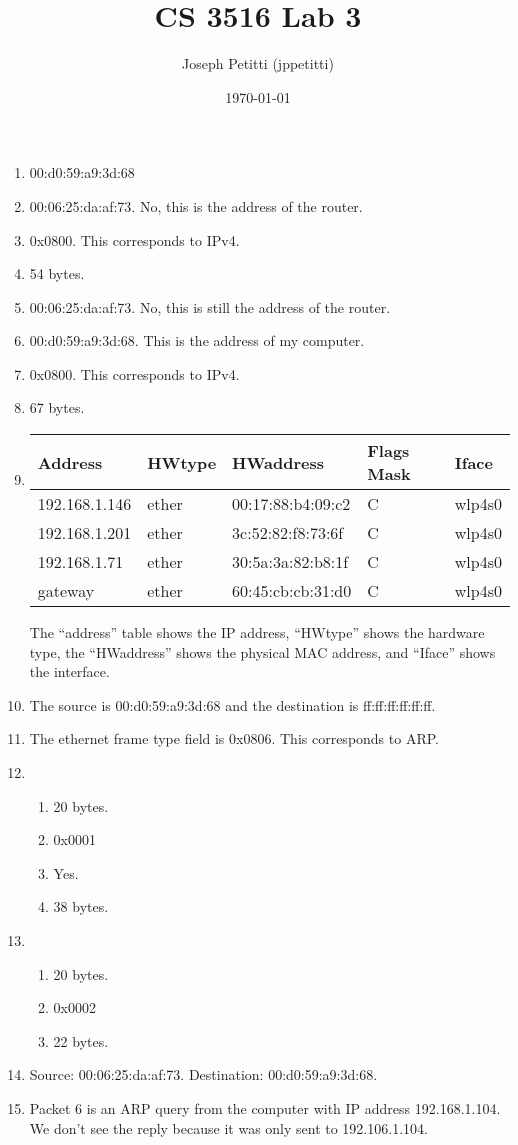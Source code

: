 \documentclass[12pt, letterpaper]{article}
\title{CS 3516 Lab 3}
\author{Joseph Petitti (jppetitti)}
\date{\today}
\begin{document}
\maketitle

\begin{enumerate}
	\item 00:d0:59:a9:3d:68
	\item 00:06:25:da:af:73. No, this is the address of the router.
	\item 0x0800. This corresponds to IPv4.
	\item 54 bytes.
	\item 00:06:25:da:af:73. No, this is still the address of the router.
	\item 00:d0:59:a9:3d:68. This is the address of my computer.
	\item 0x0800. This corresponds to IPv4.
	\item 67 bytes.
	\item
		\begin{tabular}{l | l | l | l | l}
			Address & HWtype & HWaddress & Flags Mask & Iface \\
			\hline
			192.168.1.146 & ether & 00:17:88:b4:09:c2 & C & wlp4s0 \\
			192.168.1.201 & ether & 3c:52:82:f8:73:6f & C & wlp4s0 \\
			192.168.1.71  & ether & 30:5a:3a:82:b8:1f & C & wlp4s0 \\
			gateway       & ether & 60:45:cb:cb:31:d0 & C & wlp4s0 \\
		\end{tabular}
		
				The ``address'' table shows the IP address, ``HWtype'' shows the
				hardware type, the ``HWaddress'' shows the physical MAC address,
				and ``Iface'' shows the interface.
	\item The source is 00:d0:59:a9:3d:68 and the destination is
			ff:ff:ff:ff:ff:ff.
	\item The ethernet frame type field is 0x0806. This corresponds to ARP.
	\item 
			\begin{enumerate}
					\item 20 bytes.
					\item 0x0001
					\item Yes.
					\item 38 bytes.
			\end{enumerate}
	\item 
			\begin{enumerate}
					\item 20 bytes.
					\item 0x0002
					\item 22 bytes.
			\end{enumerate}
	\item Source: 00:06:25:da:af:73. Destination: 00:d0:59:a9:3d:68.
	\item Packet 6 is an ARP query from the computer with IP address
			192.168.1.104. We don't see the reply because it was only sent to
				192.106.1.104.
\end{enumerate}
\end{document}
